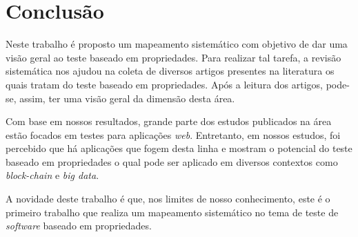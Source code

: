 \section{Conclusão} \label{sec:conclusao}
    
    Neste trabalho é proposto um mapeamento sistemático com objetivo de dar uma visão geral ao teste baseado em propriedades. Para realizar tal tarefa, a revisão sistemática nos ajudou na coleta de diversos artigos presentes na literatura os quais tratam do teste baseado em propriedades. Após a leitura dos artigos, pode-se, assim, ter uma visão geral da dimensão desta área.
    
    Com base em nossos resultados, grande parte dos estudos publicados na área estão focados em testes para aplicações \textit{web}. Entretanto, em nossos estudos, foi percebido que há aplicações que fogem desta linha e mostram o potencial do teste baseado em propriedades o qual pode ser aplicado em diversos contextos como \textit{block-chain} e \textit{big data}.
    
    A novidade deste trabalho é que, nos limites de nosso conhecimento, este é o primeiro trabalho que realiza um mapeamento sistemático no tema de teste de \textit{software} baseado em propriedades.
    